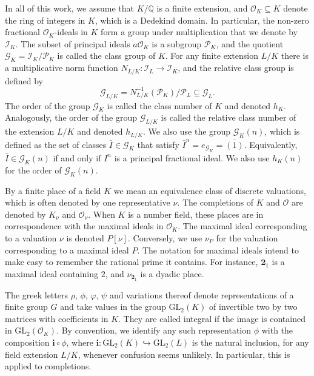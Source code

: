 \documentclass{article}
\theoremstyle{definition}
\theoremstyle{remark}
\begin{document}
In all of this work, we assume that $K/\mathbb{Q}$ is a 
finite extension, and $\mathcal{O}_K\subseteq K$ denote
the ring of integers in $K$, which is a Dedekind domain. 
In particular, the non-zero 
fractional $\mathcal{O}_K$-ideals in $K$
form a group under multiplication that we denote by
$\mathcal{I}_K$. The subset of principal 
ideals $a\mathcal{O}_K$ is
a subgroup $\mathcal{P}_K$, and the quotient 
$\mathcal{G}_K=\mathcal{I}_K/\mathcal{P}_K$ is 
called the class group
of $K$. For any finite extension $L/K$ 
there is a multiplicative 
norm function
$N_{L/K}:\mathcal{I}_L\rightarrow\mathcal{I}_K$, 
and the relative class
group is defined by
$$\mathcal{G}_{L/K}=N_{L/K}^{-1}(\mathcal{P}_K)/\mathcal{P}_L
\subseteq\mathcal{G}_L.$$
The order of the group $\mathcal{G}_K$ is called the 
class number of $K$
and denoted $h_K$. Analogously, the order 
of the group $\mathcal{G}_{L/K}$
is called the relative class number of the 
extension $L/K$ and denoted 
$h_{L/K}$. We also use the group 
$\mathcal{G}_K(n)$, which is defined
as the set of classes $\bar{I}\in\mathcal{G}_K$ that satisfy
$\bar{I}^n=e_{\mathcal{G}_K}=\overline{(1)}$.
Equivalently, $\bar{I}\in\mathcal{G}_K(n)$ if and only if
$I^n$ is a principal fractional ideal. We also use 
$h_K(n)$ for the order of  $\mathcal{G}_K(n)$.

By a finite place of a field $K$ we mean an equivalence class
of discrete valuations, which is often denoted by
one representative $\nu$. The completions of $K$
and $\mathcal{O}$ are denoted by $K_\nu$
and $\mathcal{O}_\nu$. When $K$ is a number field,
these places are in correspondence with the maximal
ideals in $\mathcal{O}_K$. The maximal ideal corresponding 
to a valuation $\nu$ is denoted $P[\nu]$. Conversely,
we use $\nu_P$ for the valuation corresponding to a maximal 
ideal $P$. The notation for maximal ideals intend to
make easy to remember the rational prime it contains.
For instance, $\mathbf{2}_1$ is a maximal ideal containing
$2$, and $\nu_{\mathbf{2}_1}$ is a dyadic place. 

The greek letters $\rho$, $\phi$, $\varphi$, $\psi$ and 
variations thereof denote representations of a 
finite group $G$ and take values in the group 
$\mathrm{GL}_2(K)$ of invertible two by two 
matrices with coefficients in $K$. They are called integral
if the image is contained in $\mathrm{GL}_2(\mathcal{O}_K)$.
By convention, we identify any such representation $\phi$ 
with the composition $\mathbf{i}\circ\phi$, where
$\mathbf{i}:\mathrm{GL}_2(K)\hookrightarrow\mathrm{GL}_2(L)$
is the natural inclusion,
for any field extension $L/K$, whenever confusion seems 
unlikely. In particular, this is applied to completions.
\end{document}
